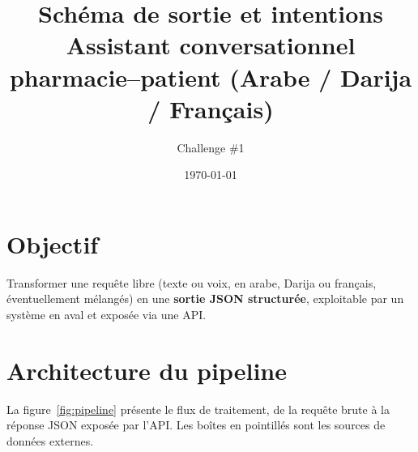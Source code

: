 \documentclass[11pt,a4paper]{article}
\title{Sch\'ema de sortie et intentions\\[2pt]
\large Assistant conversationnel pharmacie--patient (Arabe / Darija / Fran\c{c}ais)}
\author{Challenge \#1}
\date{\today}
\begin{document}
\maketitle
\tableofcontents
\bigskip

\section{Objectif}
Transformer une requ\^ete libre (texte ou voix, en arabe, Darija ou fran\c{c}ais, \'eventuellement m\'elang\'es) en une \textbf{sortie JSON structur\'ee}, exploitable par un syst\`eme en aval et expos\'ee via une API.

\section{Architecture du pipeline}

La figure~\ref{fig:pipeline} pr\'esente le flux de traitement, de la requ\^ete brute \`a la r\'eponse JSON expos\'ee par l'API. Les bo\^ites en pointill\'es sont les sources de donn\'ees externes.
\end{document}
